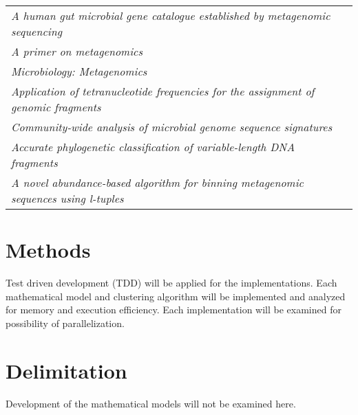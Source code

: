 \documentclass{article}
\begin{document}
\begin{tabularx}{\linewidth}{>{\itshape}X | p{5cm}}
A human gut microbial gene catalogue established by metagenomic sequencing & \cite{Qin2010}\\

A primer on metagenomics & \cite{Wooley2010}\\

Microbiology: Metagenomics \cite{Hugenholtz2008}\\

Application of tetranucleotide frequencies for the assignment of genomic fragments & \cite{Teeling2004a}\\

Community-wide analysis of microbial genome sequence signatures & \cite{Dick2009}\\

Accurate phylogenetic classification of variable-length DNA fragments & \cite{McHardy2007}\\

A novel abundance-based algorithm for binning metagenomic sequences using l-tuples & \cite{Wu2011}\\

\end{tabularx}

\section*{Methods}

Test driven development (TDD) will be applied for the implementations. Each mathematical model and clustering algorithm will be implemented and analyzed for memory and execution efficiency. Each implementation will be examined for possibility of parallelization.

\pagebreak

\section*{Delimitation}

Development of the mathematical models will not be examined here.
\end{document}
